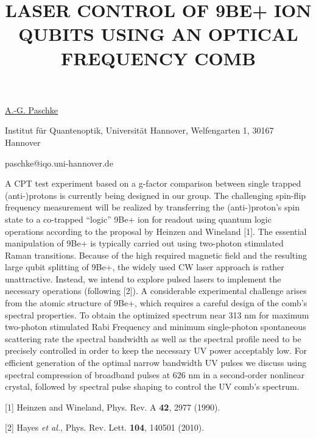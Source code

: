 \title{LASER CONTROL OF 9BE+ ION QUBITS USING AN OPTICAL FREQUENCY COMB}

\underline{A.-G. Paschke} 

{\normalsize{\vspace{-4mm}
Institut f\"ur Quantenoptik, Universit\"at Hannover,
Welfengarten 1, 30167 Hannover

\email paschke@iqo.uni-hannover.de}}

A CPT test experiment based on a g-factor comparison between single trapped (anti-)protons is currently being designed in our group. The challenging spin-flip frequency measurement will be realized by transferring the (anti-)proton's spin state to a co-trapped ``logic'' 9Be+ ion for readout using quantum logic operations according to the proposal by Heinzen and Wineland [1].
The essential manipulation of 9Be+ is typically carried out using two-photon stimulated Raman transitions. Because of the high required magnetic field and the resulting large qubit splitting of 9Be+, the widely used CW laser approach is rather unattractive. Instead, we intend to explore pulsed lasers to implement the necessary operations (following [2]).
A considerable experimental challenge arises from the atomic structure of 9Be+, which requires a careful design of the comb's spectral properties. To obtain the optimized spectrum near 313 nm for maximum two-photon stimulated Rabi Frequency and minimum single-photon spontaneous scattering rate the spectral bandwidth as well as the spectral profile need to be precisely controlled in order to keep the necessary UV power acceptably low. For efficient generation of the optimal narrow bandwidth UV pulses we discuss using spectral compression of broadband pulses at 626 nm in a second-order nonlinear crystal, followed by spectral pulse shaping to control the UV comb's spectrum.

{\normalsize
[1] Heinzen and Wineland, Phys. Rev. A \textbf{42}, 2977 (1990).
\vsp

[2] Hayes \textit{et al.}, Phys. Rev. Lett. \textbf{104}, 140501 (2010).
}

\vspace{\baselineskip}
